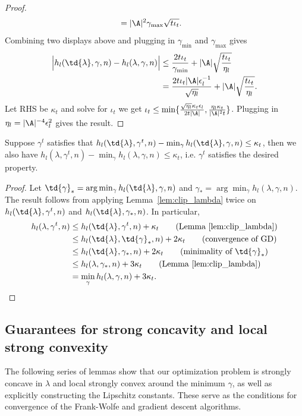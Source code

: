 \documentclass{article}
\newcommand{\1}{\mathbf{1}}
\begin{document}
\begin{proof}
\begin{align*}
    &= |\A|^2\gamma_{\max}\sqrt{t\iota_t}.
\end{align*}
Combining two displays above and plugging in $\gamma_{\min}$ and $\gamma_{\max}$ gives 
\begin{align*}
    \Big|h_l(\td{\lambda},\gamma,n)-h_l(\lambda,\gamma,n)\Big|&\leq \frac{2t\iota_t}{\gamma_{\min}}+|\A|\sqrt{\frac{t\iota_t}{\eta_l}}\\
    &= \frac{2t\iota_t|\A|\epsilon_{l}^{-1}}{\sqrt{\eta_l}}+|\A|\sqrt{\frac{t\iota_t}{\eta_l}}.
\end{align*}
Let RHS be $\kappa_t$ and solve for $\iota_t$ we get $\iota_t\leq \min\{\frac{\sqrt{\eta_l}\kappa_t\epsilon_l}{2t|\A|},\frac{\eta_l\kappa_t}{|\A|^2t}\}$. Plugging in $\eta_l=|\A|^{-4}\epsilon_l^2$ gives the result. 
\end{proof}

\begin{lemma}\label{lem:G_11}
Suppose $\gamma^{t}$ satisfies that $h_l(\td{\lambda},\gamma^{t},n)-\min_{\gamma}h_l(\td{\lambda},\gamma,n)\leq \kappa_t$, then we also have $h_l(\lambda,\gamma^{t},n)-\min_{\gamma}h_l(\lambda,\gamma,n)\leq \kappa_t$, i.e. $\gamma^{t}$ satisfies the desired property. 
\end{lemma}
\begin{proof}
Let $\td{\gamma}_*=\arg\min_{\gamma}h_l(\td{\lambda},\gamma,n)$ and $\gamma_*=\arg\min_{\gamma}h_l(\lambda,\gamma,n)$. The result follows from applying Lemma~\ref{lem:clip_lambda} twice on $h_l(\td{\lambda},\gamma^{t},n)$ and $h_l(\td{\lambda},\gamma_*,n)$. In particular, 
\begin{align*}
    h_l(\lambda,\gamma^{t},n)&\leq h_l(\td{\lambda},\gamma^{t},n)+\kappa_t\tag{Lemma~\ref{lem:clip_lambda}}\\
    &\leq h_l(\td{\lambda},\td{\gamma}_*,n)+2\kappa_t\tag{convergence of GD}\\
    &\leq h_l(\td{\lambda},\gamma_*,n)+2\kappa_t\tag{minimality of $\td{\gamma}_*$}\\
    &\leq h_l(\lambda,\gamma_*,n)+3\kappa_t\tag{Lemma~\ref{lem:clip_lambda}}\\
    &= \min_{\gamma}h_l(\lambda,\gamma,n)+3\kappa_t.
\end{align*}
\end{proof}
\subsection{Guarantees for strong concavity and local strong convexity}

The following series of lemmas show that our optimization problem is strongly concave in $\lambda$ and local strongly convex around the minimum $\gamma$, as well as explicitly constructing the Lipschitz constants. These serve as the conditions for convergence of the Frank-Wolfe and gradient descent algorithms. 
\end{document}
